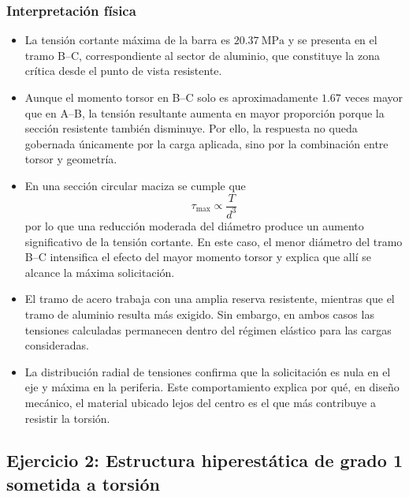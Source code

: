 \documentclass[12pt,a4paper]{article}
\begin{document}
\begin{enumerate}
\subsubsection*{Interpretación física}

\begin{itemize}
    \item La tensión cortante máxima de la barra es $20.37\ \text{MPa}$ y se presenta en el tramo B--C, correspondiente al sector de aluminio, que constituye la zona crítica desde el punto de vista resistente.
    
    \item Aunque el momento torsor en B--C solo es aproximadamente $1.67$ veces mayor que en A--B, la tensión resultante aumenta en mayor proporción porque la sección resistente también disminuye. Por ello, la respuesta no queda gobernada únicamente por la carga aplicada, sino por la combinación entre torsor y geometría.
    
    \item En una sección circular maciza se cumple que
    \[
    \tau_{\max}\propto \frac{T}{d^3}
    \]
    por lo que una reducción moderada del diámetro produce un aumento significativo de la tensión cortante. En este caso, el menor diámetro del tramo B--C intensifica el efecto del mayor momento torsor y explica que allí se alcance la máxima solicitación.
    
    \item El tramo de acero trabaja con una amplia reserva resistente, mientras que el tramo de aluminio resulta más exigido. Sin embargo, en ambos casos las tensiones calculadas permanecen dentro del régimen elástico para las cargas consideradas.
    
    \item La distribución radial de tensiones confirma que la solicitación es nula en el eje y máxima en la periferia. Este comportamiento explica por qué, en diseño mecánico, el material ubicado lejos del centro es el que más contribuye a resistir la torsión.
\end{itemize}

\end{enumerate}
\newpage

\subsection{Ejercicio 2: Estructura hiperestática de grado 1 sometida a torsión}
\end{document}

